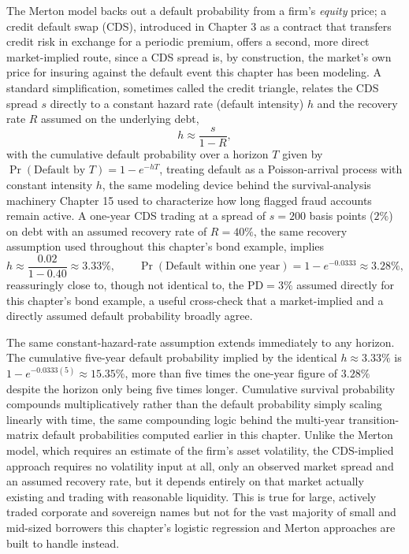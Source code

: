 \documentclass[../ai_in_finance]{subfiles}
\begin{document}
The Merton model backs out a default probability from a firm's \emph{equity} price; a credit default swap (CDS), introduced in Chapter 3 as a contract that transfers credit risk in exchange for a periodic premium, offers a second, more direct market-implied route, since a CDS spread is, by construction, the market's own price for insuring against the default event this chapter has been modeling. A standard simplification, sometimes called the credit triangle, relates the CDS spread $s$ directly to a constant hazard rate (default intensity) $h$ and the recovery rate $R$ assumed on the underlying debt,
\begin{equation*}
h \approx \frac{s}{1-R},
\end{equation*}
with the cumulative default probability over a horizon $T$ given by $\Pr(\text{Default by } T) = 1-e^{-hT}$, treating default as a Poisson-arrival process with constant intensity $h$, the same modeling device behind the survival-analysis machinery Chapter 15 used to characterize how long flagged fraud accounts remain active. A one-year CDS trading at a spread of $s=200$ basis points ($2\%$) on debt with an assumed recovery rate of $R=40\%$, the same recovery assumption used throughout this chapter's bond example, implies
\begin{equation*}
h \approx \frac{0.02}{1-0.40} \approx 3.33\%, \qquad \Pr(\text{Default within one year}) = 1-e^{-0.0333} \approx 3.28\%,
\end{equation*}
reassuringly close to, though not identical to, the $\text{PD}=3\%$ assumed directly for this chapter's bond example, a useful cross-check that a market-implied and a directly assumed default probability broadly agree.

The same constant-hazard-rate assumption extends immediately to any horizon. The cumulative five-year default probability implied by the identical $h\approx3.33\%$ is $1-e^{-0.0333(5)} \approx 15.35\%$, more than five times the one-year figure of $3.28\%$ despite the horizon only being five times longer. Cumulative survival probability compounds multiplicatively rather than the default probability simply scaling linearly with time, the same compounding logic behind the multi-year transition-matrix default probabilities computed earlier in this chapter. Unlike the Merton model, which requires an estimate of the firm's asset volatility, the CDS-implied approach requires no volatility input at all, only an observed market spread and an assumed recovery rate, but it depends entirely on that market actually existing and trading with reasonable liquidity.
This is true for large, actively traded corporate and sovereign names but not for the vast majority of small and mid-sized borrowers this chapter's logistic regression and Merton approaches are built to handle instead.
\end{document}
